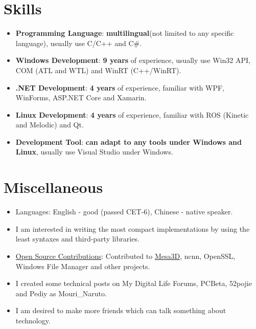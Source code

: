 \documentclass{resume}
\begin{document}
\section{Skills}
\begin{itemize}

  \item \textbf{Programming Language}:
    \textbf{multilingual}(not limited to any specific language), usually use C/C++ and C\#.

  \item \textbf{Windows Development}:
    \textbf{9 years} of experience, usually use Win32 API, COM (ATL and WTL) and WinRT (C++/WinRT).

  \item \textbf{.NET Development}:
    \textbf{4 years} of experience, familiar with WPF, WinForms, ASP.NET Core and Xamarin.
  
  \item \textbf{Linux Development}:
    \textbf{4 years} of experience, familiar with ROS (Kinetic and Melodic) and Qt.

  \item \textbf{Development Tool}:
    \textbf{can adapt to any tools under Windows and Linux}, usually use Visual Studio under Windows.

\end{itemize}

\section{Miscellaneous}
\begin{itemize}

  \item Languages: English - good (passed CET-6),  Chinese - native speaker.

  \item I am interested in writing the most compact implementations by using the least syntaxes and third-party libraries.

  \item \href{https://github.com/search?q=is%3Apr%20author%3AMouriNaruto&type=pullrequests}{Open Source Contributions}: Contributed to \href{https://gitlab.freedesktop.org/mesa/mesa/-/merge_requests/22961}{Mesa3D}, ncnn, OpenSSL, Windows File Manager and other projects.
  
  \item I created some technical posts on My Digital Life Forums, PCBeta, 52pojie and Pediy as Mouri\_Naruto.
  
  \item I am desired to make more friends which can talk something about technology.
  
\end{itemize}
\end{document}
